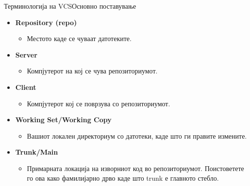 \begin{frame}{Терминологија на VCS}{Основно поставување}
\begin{itemize}
    \item \textbf{Repository (repo)}
    \begin{itemize} 
        \item Местото каде се чуваат датотеките.
    \end{itemize}
    \item \textbf{Server}
    \begin{itemize} 
        \item Компјутерот на кој се чува репозиториумот.
    \end{itemize}
    \item \textbf{Client}
    \begin{itemize} 
        \item Компјутерот кој се поврзува со репозиториумот.
    \end{itemize}
    \item \textbf{Working Set/Working Copy}
    \begin{itemize} 
        \item Вашиот локален директориум со датотеки, каде што
    ги правите измените.
    \end{itemize}
    \item \textbf{Trunk/Main}
    \begin{itemize} 
        \item Примарната локација на изворниот код во репозиториумот.
    Поистоветете го ова како фамилијарно дрво каде што trunk е главното стебло.
    \end{itemize}
\end{itemize}
\end{frame}

